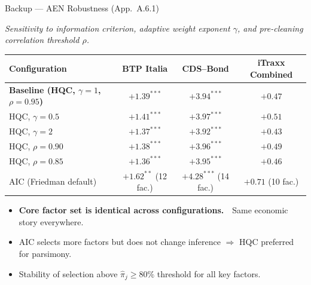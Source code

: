 \documentclass[aspectratio=169,11pt]{beamer}
\newcommand{\hlt}[1]{\textcolor{edhecred}{\textbf{#1}}}     %
\begin{document}
\begin{frame}[t]{Backup --- AEN Robustness (App.\ A.6.1)}
\centering
\scriptsize
\vspace{0.10cm}

\textit{Sensitivity to information criterion, adaptive weight exponent $\gamma$,
and pre-cleaning correlation threshold $\rho$.}

\vspace{0.30cm}
\renewcommand{\arraystretch}{1.20}
\setlength{\tabcolsep}{6pt}

\begin{tabular}{lccc}
\toprule
Configuration                     & BTP Italia            & CDS--Bond              & iTraxx Combined \\
\midrule
\textbf{Baseline (HQC, $\gamma=1$, $\rho=0.95$)} & $+1.39^{***}$ & $+3.94^{***}$ & $+0.47$ \\
HQC, $\gamma=0.5$                  & $+1.41^{***}$         & $+3.97^{***}$         & $+0.51$ \\
HQC, $\gamma=2$                    & $+1.37^{***}$         & $+3.92^{***}$         & $+0.43$ \\
HQC, $\rho=0.90$                   & $+1.38^{***}$         & $+3.96^{***}$         & $+0.49$ \\
HQC, $\rho=0.85$                   & $+1.36^{***}$         & $+3.95^{***}$         & $+0.46$ \\
AIC (Friedman default)             & $+1.62^{**}$ (12 fac.) & $+4.28^{***}$ (14 fac.) & $+0.71$ (10 fac.) \\
\bottomrule
\end{tabular}

\vspace{0.40cm}

\begin{itemize}\itemsep=0.06cm\footnotesize
  \item \hlt{Core factor set is identical across configurations.}\ \  Same economic story everywhere.
  \item AIC selects more factors but does not change inference $\Rightarrow$ HQC
        preferred for parsimony.
  \item Stability of selection above $\hat\pi_j \geq 80\%$ threshold for all key factors.
\end{itemize}

\end{frame}
\end{document}

